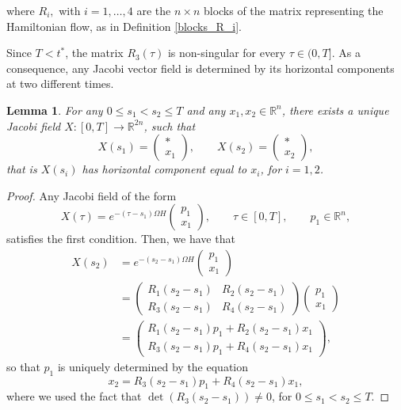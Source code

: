 \documentclass[reqno]{amsart}
\theoremstyle{plain}
\newtheorem{lem}[thm]{Lemma}
\theoremstyle{definition}
\theoremstyle{remark}
\begin{document}
		where $R_i,$ with $i=1,\dots,4$ are the $n\times n$ blocks of the matrix representing the Hamiltonian flow, as in Definition \ref{blocks_R_i}.
        
        Since $T<t^*$, the matrix $R_3(\tau)$ is non-singular for every $\tau\in(0,T]$. As a consequence, any Jacobi vector field is determined by its horizontal components at two different times. 
		\begin{lem}\label{uniq_det}
			For any $0\leq s_1 < s_2 \leq T$ and any $x_1, x_2\in\mathbb{R}^n$, there exists a unique Jacobi field $X:[0,T]\to\mathbb{R}^{2n}$, such that
			\begin{equation}
				X(s_1)=\begin{pmatrix}
					*\\
					x_1
				\end{pmatrix},\qquad X(s_2)=\begin{pmatrix}
					*\\
					x_2
				\end{pmatrix},
			\end{equation}
			that is $X(s_i)$ has horizontal component equal to $x_i$, for $i=1,2$.
		\end{lem}
		\begin{proof}
			Any Jacobi field of the form 
			\begin{equation}
				X(\tau)=e^{-(\tau-s_1)\Omega H}\begin{pmatrix}
					p_1\\
					x_1
				\end{pmatrix},\qquad \tau\in[0,T],\qquad p_1\in\mathbb{R}^n,
			\end{equation}
			satisfies the first condition. Then, we have that 
			\begin{align}
				X(s_2)&=e^{-(s_2-s_1)\Omega H}\begin{pmatrix}
					p_1\\
					x_1
				\end{pmatrix}\\
				&=\begin{pmatrix}
				R_1(s_2-s_1) & R_2(s_2-s_1)\\
				R_3(s_2-s_1) & R_4(s_2-s_1)
				\end{pmatrix}\begin{pmatrix}
				p_1\\
				x_1
				\end{pmatrix}\\
				&=\begin{pmatrix}
				R_1(s_2-s_1)p_1+R_2(s_2-s_1)x_1\\
				R_3(s_2-s_1)p_1+R_4(s_2-s_1)x_1
				\end{pmatrix},
			\end{align}
			so that $p_1$ is uniquely determined by the equation
			\begin{equation}
				x_2=R_3(s_2-s_1)p_1+R_4(s_2-s_1)x_1,
			\end{equation}
			where we used the fact that $\det(R_3(s_2-s_1))\neq 0$, for $0\leq s_1< s_2\leq T$.
		\end{proof}
\end{document}
